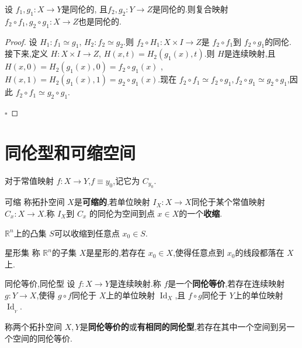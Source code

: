 \documentclass[../../几何与拓扑.tex]{subfiles}
\begin{document}
\begin{theorem}\label{同伦保复合}
    设 \(  f_1,g_1:X\to Y  \)是同伦的, 且\(  f_2,g_2:Y\to Z  \)是同伦的.则复合映射 \(  f_2\circ f_1,g_2\circ g_1: X\to Z  \)也是同伦的.   
\end{theorem}
\begin{proof}

    设 \(  H_1: f_1\simeq g_1  \), \(  H_2:f_2\simeq g_2  \).则 \(  f_2\circ H_1:X\times I\to Z  \)是 \(  f_2\circ f_1  \)到 \(  f_2\circ g_1  \)的同伦.
    接下来,定义 \(  H:X\times I\to Z  \), \(  H\left( x,t \right)= H_2\left( g_1\left( x \right)  ,t\right)    \).则 \(  H  \)是连续映射,且 \(  H\left( x,0 \right)= H_2\left( g_1\left( x \right),0  \right)= f_2\circ g_1\left( x \right)     \)         ,
     \(  H\left( x,1 \right) =  H_2\left( g_1\left( x \right),1  \right)= g_2\circ g_1\left( x \right)     \).现在 \(  f_2\circ f_1\simeq f_2\circ g_1, f_2\circ g_1\simeq g_2\circ g_1  \),因此 \(  f_2\circ f_1 \simeq  g_2\circ g_1  \).


    \hfill $\square$
\end{proof}

\hspace*{\fill}




\section{同伦型和可缩空间}


对于常值映射 \(  f:X \to Y  \),\(  f \equiv y_0  \),记它为 \(  C_{y_0}  \).


\begin{definition}{可缩}
    称拓扑空间 \(  X  \)是\textbf{可缩的},若单位映射 \(  I _{X}:X\to X  \)同伦于某个常值映射 \(  C_{x}:X \to X  \).称 \(  I _{X}  \)到 \(  C_{x}  \)  的同伦为空间到点 \(  x \in X  \)的一个\textbf{收缩}. 
\end{definition}

\begin{example}
     \(  \mathbb{R} ^{n}  \)上的凸集 \(  S  \)可以收缩到任意点 \(  x_0 \in S  \).   
\end{example}

\begin{definition}{星形集}
    称 \(  \mathbb{R} ^{n}  \)的子集 \(  X  \)是星形的,若存在 \(  x_0 \in X  \),使得任意点到 \(  x_0  \)的线段都落在 \(  X  \)上.   
\end{definition}

\begin{definition}{同伦等价,同伦型}
    设 \(  f:X \to Y  \)是连续映射.称 \(  f  \)是一个\textbf{同伦等价},若存在连续映射 \(  g:Y \to X  \),使得 \(  g\circ f  \)同伦于 \(  X  \)上的单位映射 \(  \operatorname{Id}_{X}  \),且 \(  f\circ g  \)同伦于 \(  Y  \)上的单位映射 \(  \operatorname{Id}_{_{Y}}  \).
    
    称两个拓扑空间 \(  X,Y  \)是\textbf{同伦等价的}或\textbf{有相同的同伦型},若存在其中一个空间到另一个空间的同伦等价. 
\end{definition}
\end{document}
